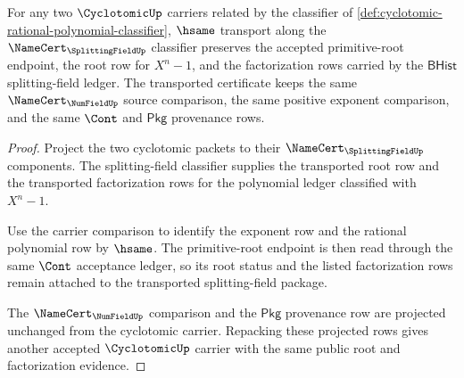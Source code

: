 \begin{theorem}
\label{thm:cyclotomic-splittingfield-stability}
For any two $\CyclotomicUp$ carriers related by the classifier of \autoref{def:cyclotomic-rational-polynomial-classifier}, $\hsame$ transport along the $\NameCert_{\SplittingFieldUp}$ classifier preserves the accepted primitive-root endpoint, the root row for $X^n-1$, and the factorization rows carried by the $\mathsf{BHist}$ splitting-field ledger. The transported certificate keeps the same $\NameCert_{\NumFieldUp}$ source comparison, the same positive exponent comparison, and the same $\Cont$ and $\mathsf{Pkg}$ provenance rows.
\end{theorem}
\begin{proof}
Project the two cyclotomic packets to their $\NameCert_{\SplittingFieldUp}$ components. The splitting-field classifier supplies the transported root row and the transported factorization rows for the polynomial ledger classified with $X^n-1$.

Use the carrier comparison to identify the exponent row and the rational polynomial row by $\hsame$. The primitive-root endpoint is then read through the same $\Cont$ acceptance ledger, so its root status and the listed factorization rows remain attached to the transported splitting-field package.

The $\NameCert_{\NumFieldUp}$ comparison and the $\mathsf{Pkg}$ provenance row are projected unchanged from the cyclotomic carrier. Repacking these projected rows gives another accepted $\CyclotomicUp$ carrier with the same public root and factorization evidence.
\end{proof}

